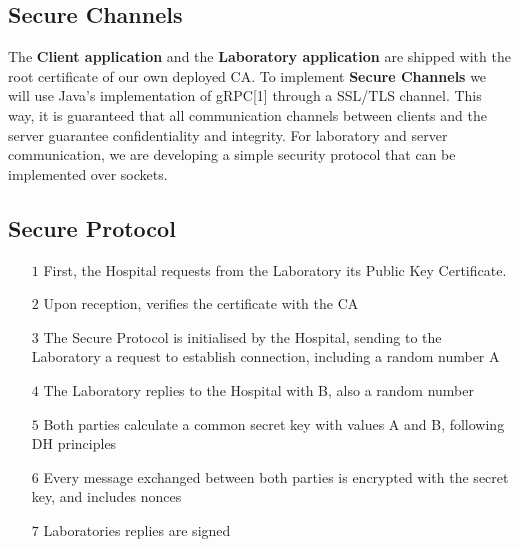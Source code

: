 \documentclass{article}
\begin{document}
\subsection{Secure Channels}
The {\bf Client application} and the {\bf Laboratory application} are shipped with the root certificate of our own deployed CA. To implement {\bf Secure Channels} we will use Java's implementation of gRPC[1] through a SSL/TLS channel. This way, it is guaranteed that all communication channels between clients and the server guarantee confidentiality and integrity. For laboratory and server communication, we are developing a simple security protocol that can be implemented over sockets.
\subsection{Secure Protocol}





\begin{itemize}
\item[$1$] First, the Hospital requests from the Laboratory its Public Key Certificate. 
\item[$2$] Upon reception, verifies the certificate with the CA 
\item[$3$] The Secure Protocol is initialised by the Hospital, sending to the Laboratory a request to establish connection, including a random number A
\item[$4$] The Laboratory replies to the Hospital with B, also a random number
\item[$5$] Both parties calculate a common secret key with values A and B, following DH principles
\item[$6$] Every message exchanged between both parties is encrypted with the secret key, and includes nonces
\item[$7$] Laboratories replies are signed
\end{itemize}
\end{document}
